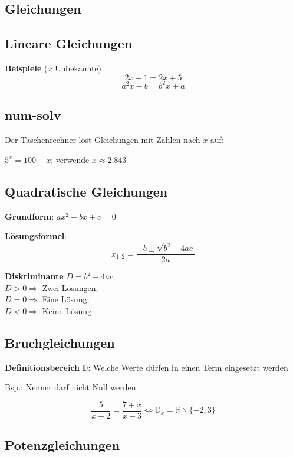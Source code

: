 \begin{multicols}{2}
\hrulefill
\section*{Gleichungen}

\subsection*{Lineare Gleichungen}

\textbf{Beispiele} ($x$ Unbekannte)
$$2x+1= 2x+5$$
$$a^2x-b=b^2x+a$$


\subsection*{num-solv}
Der Taschenrechner löst Gleichungen mit Zahlen nach $x$ auf:

$5^x = 100 -x$; verwende  $x\approx{}2.843$

\forceCB
\subsection*{Quadratische Gleichungen}

\textbf{Grundform}: $ax^2 + bx+c = 0$

\textbf{Lösungsformel}:
$$x_{1,2} = \frac{-b \pm \sqrt{b^2-4ac}}{2a}$$

\textbf{Diskriminante} $D = b^2-4ac$\\
$D>0\Longrightarrow$ Zwei Lösungen;\\
$D=0\Longrightarrow$ Eine Lösung;\\
$D<0\Longrightarrow$ Keine Lösung


\subsection*{Bruchgleichungen}

\textbf{Definitionsbereich} $\mathbb{D}$: Welche Werte dürfen in einen Term eingesetzt werden

Bsp.: Nenner darf nicht Null werden:

$$\frac5{x+2}=\frac{7+x}{x-3} \Leftrightarrow{} \mathbb{D}_x=\mathbb{R}\backslash{}\{-2, 3\}$$

\subsection*{Potenzgleichungen}



\end{multicols}
